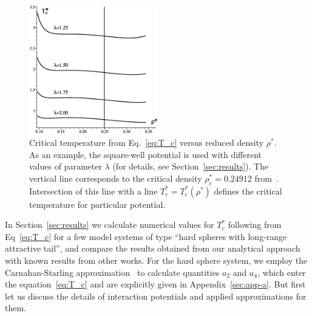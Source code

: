 \begin{figure}[htbp]
	\captionsetup{width=0.6\textwidth}
	\centering
	\includegraphics[width=0.5\textwidth,angle=0]{critical_temp_vs_rho}
	\caption{Critical temperature from Eq.~\eqref{eq:T_c} versus reduced density $\rho^*$. As an example, the square-well potential is used with different values of parameter $\lambda$ (for details, see Section~\ref{sec:results}). The vertical line corresponds to the critical density $\rho^*_c=0.24912$ from~\cite{YukhJSP1995}. Intersection of this line with a line $T_c^* = T_c^*(\rho^*)$ defines the critical temperature for particular potential.}
	\label{fig:t_c_vs_rho}
\end{figure}

In Section~\ref{sec:results} we calculate numerical values for $T^*_c$ following from Eq~\eqref{eq:T_c} for a few model systems of type ``hard spheres with long-range attractive tail'', and compare the results obtained from our analytical approach with known results from other works. For the hard sphere system, we employ the Carnahan-Starling approximation~\cite{CarnahanStarling1969} to calculate quantities $a_2$ and $a_4$, which enter the equation~\eqref{eq:T_c} and are explicitly given in Appendix~\ref{sec:app-a}. But first let us discuss the details of interaction potentials and applied approximations for them.
